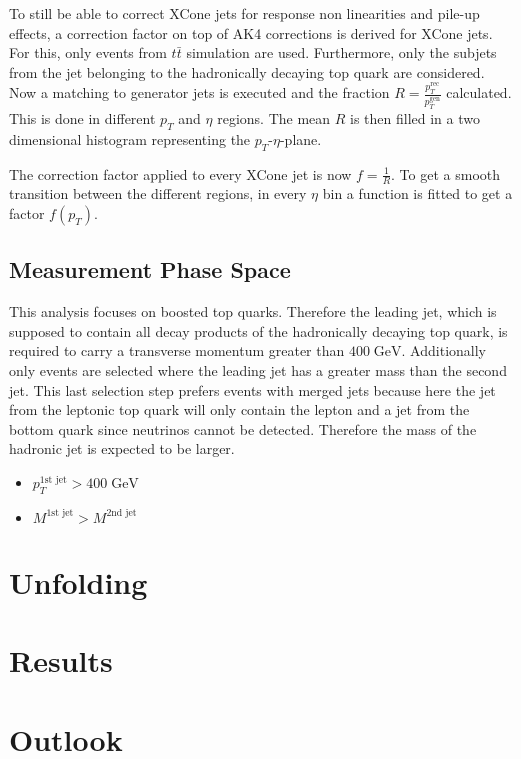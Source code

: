 	To still be able to correct XCone jets for response non linearities and pile-up effects, a correction factor on top of AK4 corrections is derived for XCone jets. For this, only events from $t\bar{t}$ simulation are used. Furthermore, only the subjets from the jet belonging to the hadronically decaying top quark are considered. Now a matching to generator jets is executed and the fraction $R=\frac{p_T^{\text{rec}}}{p_T^{\text{gen}}}$ calculated. This is done in different $p_T$ and $\eta$ regions. The mean $R$ is then filled in a two dimensional histogram representing the $p_T$-$\eta$-plane.
	
	The correction factor applied to every XCone jet is now $f = \frac{1}{R}$. To get a smooth transition between the different regions, in every $\eta$ bin a function is fitted to get a factor $f(p_T)$.
\subsection{Measurement Phase Space}
\label{sec:FinalSel}
	This analysis focuses on boosted top quarks. Therefore the leading jet, which is supposed to contain all decay products of the hadronically decaying top quark, is required to carry a transverse momentum greater than $400\;\text{GeV}$. Additionally only events are selected where the leading jet has a greater mass than the second jet. This last selection step prefers events with merged jets because here the jet from the leptonic top quark will only contain the lepton and a jet from the bottom quark since neutrinos cannot be detected. Therefore the mass of the hadronic jet is expected to be larger.
	\begin{itemize}
	\item $p_T^{\text{1st jet}} > 400\;\text{GeV}$ 
	\item $M^{\text{1st jet}} > M^{\text{2nd jet}}$
	\end{itemize}

\section{Unfolding}
\section{Results}
\section{Outlook}

\label{sec:results}